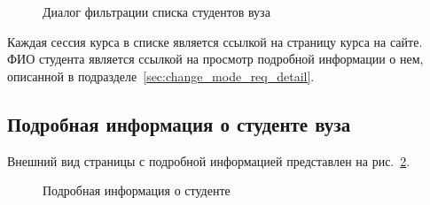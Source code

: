  
\begin{figure}[H]
	\caption{Диалог фильтрации списка студентов вуза}
	\label{img:student:univ_student_list_filter}
\end{figure}

Каждая сессия курса в списке является ссылкой на страницу курса на сайте. 
ФИО студента является ссылкой на просмотр подробной информации о нем, 
описанной в подразделе~\ref{sec:change_mode_req_detail}.

\subsection{Подробная информация о студенте вуза} \label{sec:student_detail}
Внешний вид страницы с подробной информацией представлен на рис.~\ref{img:student:student_detail}.

\begin{figure}[H]
	\caption{Подробная информация о студенте}
	\label{img:student:student_detail}
\end{figure}

